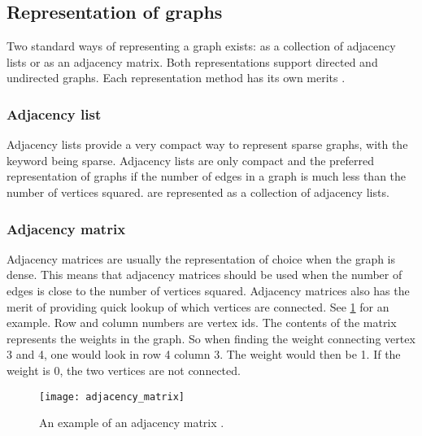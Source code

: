 

\subsection{Representation of graphs}

Two standard ways of representing a graph exists: as a collection of adjacency lists or as an adjacency matrix. Both representations support directed and undirected graphs. Each representation method has its own merits \cite{Cormen2009}.

\subsubsection{Adjacency list}
Adjacency lists provide a very compact way to represent sparse graphs, with the keyword being sparse. Adjacency lists are only compact and the preferred representation of graphs if the number of edges in a graph is much less than the number of vertices squared.  are represented as a collection of adjacency lists.

\subsubsection{Adjacency matrix}
Adjacency matrices are usually the representation of choice when the graph is dense. This means that adjacency matrices should be used when the number of edges is close to the number of vertices squared. Adjacency matrices also has the merit of providing quick lookup of which vertices are connected. See \cref{fig:adjacency_matrix} for an example. Row and column numbers are vertex ids. The contents of the matrix represents the weights in the graph. So when finding the weight connecting vertex 3 and 4, one would look in row 4 column 3. The weight would then be 1. If the weight is 0, the two vertices are not connected.

\begin{figure}[ht!]
    \centering
    \texttt{[image: adjacency\_matrix]}
    \caption{An example of an adjacency matrix \cite{Cormen2009}.}
    \label{fig:adjacency_matrix}
  \end{figure}